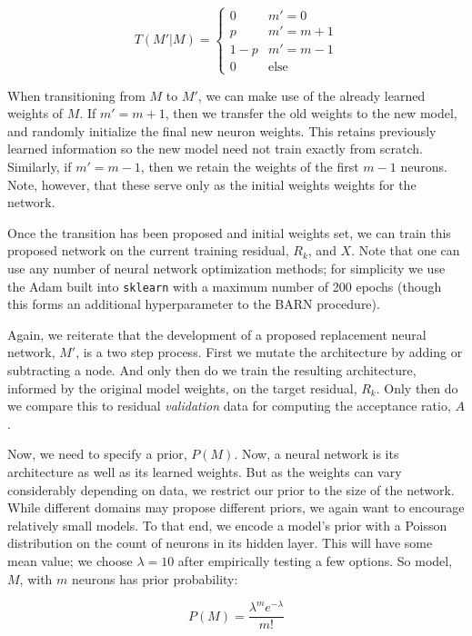 \documentclass[12pt]{article}
\begin{document}
$$
T(M'|M) = \begin{cases}
			0 & m' = 0 \\
			p & m' = m + 1 \\
			1-p & m' = m - 1 \\
			0 & \text{else} 
\end{cases}
$$

When transitioning from $M$ to $M'$, we can make use of the already learned weights of $M$.  If $m' = m+1$, then we transfer the old weights to the new model, and randomly initialize the final new neuron weights.  This retains previously learned information so the new model need not train exactly from scratch.  Similarly, if $m' = m-1$, then we retain the weights of the first $m-1$ neurons.  Note, however, that these serve only as the initial weights weights for the network.

Once the transition has been proposed and initial weights set, we can train this proposed network on the current training residual, $R_k$, and $X$.  Note that one can use any number of neural network optimization methods; for simplicity we use the Adam built into \texttt{sklearn} \cite{kingma2014adam} with a maximum number of 200 epochs (though this forms an additional hyperparameter to the BARN procedure).

Again, we reiterate that the development of a proposed replacement neural network, $M'$, is a two step process.  First we mutate the architecture by adding or subtracting a node.  And only then do we train the resulting architecture, informed by the original model weights, on the target residual, $R_k$.  Only then do we compare this to residual \emph{validation} data for computing the acceptance ratio, $A$.

Now, we need to specify a prior, $P(M)$.  Now, a neural network is its architecture as well as its learned weights.  But as the weights can vary considerably depending on data, we restrict our prior to the size of the network.  While different domains may propose different priors, we again want to encourage relatively small models.  To that end, we encode a model's prior with a Poisson distribution on the count of neurons in its hidden layer.  This will have some mean value; we choose $\lambda=10$ after empirically testing a few options.  So model, $M$, with $m$ neurons has prior probability:

$$
P(M) = \frac{\lambda^m e^{-\lambda}}{m!}
$$
\end{document}
